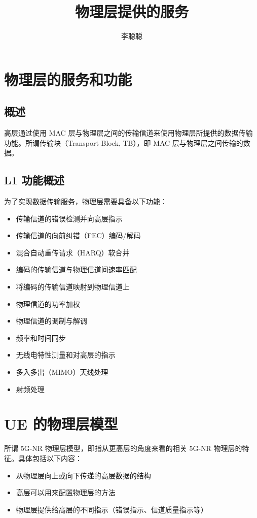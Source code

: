 \documentclass[cn,hazy,blue,14pt,screen,device=normal]{elegantnote}
\title{物理层提供的服务}
\author{李聪聪}
\institute{3GPP TS 38.202 V15.6.0}
\date{\zhtoday}
\begin{document}
\maketitle

\newpage
\tableofcontents
\newpage

\section{物理层的服务和功能}
\subsection{概述}
高层通过使用 MAC 层与物理层之间的传输信道来使用物理层所提供的数据传输功能。所谓传输块（Transport Block, TB），即 MAC 层与物理层之间传输的数据。

\subsection{L1 功能概述}
为了实现数据传输服务，物理层需要具备以下功能：
\begin{itemize}[leftmargin=2cm]
	\item 传输信道的错误检测并向高层指示
	\item 传输信道的向前纠错（FEC）编码/解码
	\item 混合自动重传请求（HARQ）软合并
	\item 编码的传输信道与物理信道间速率匹配
	\item 将编码的传输信道映射到物理信道上
	\item 物理信道的功率加权
	\item 物理信道的调制与解调
	\item 频率和时间同步
	\item 无线电特性测量和对高层的指示
	\item 多入多出（MIMO）天线处理
	\item 射频处理
\end{itemize}

\section{UE 的物理层模型}
所谓 5G-NR 物理层模型，即指从更高层的角度来看的相关 5G-NR 物理层的特征。具体包括以下内容：
\begin{itemize}[leftmargin=2cm]
	\item 从物理层向上或向下传递的高层数据的结构
	\item 高层可以用来配置物理层的方法
	\item 物理层提供给高层的不同指示（错误指示、信道质量指示等）
\end{itemize}
\end{document}

